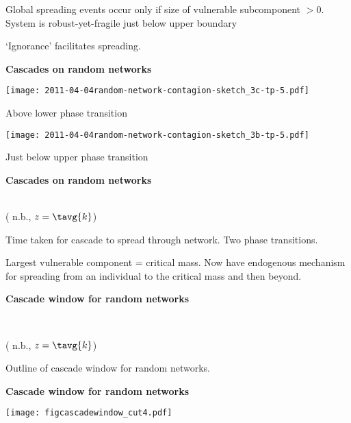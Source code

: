   
  
   
    Global spreading events occur only if size of vulnerable subcomponent $>0$.\\
   
    System is robust-yet-fragile just below upper boundary\cite{carlson1999a,carlson2000a,sornette2003a}
   
    `Ignorance' facilitates spreading.
  


  \textbf{Cascades on random networks}

      
    \texttt{[image: 2011-04-04random-network-contagion-sketch\_3c-tp-5.pdf]}
    
     
      Above lower phase transition
    
    
    \texttt{[image: 2011-04-04random-network-contagion-sketch\_3b-tp-5.pdf]}
    
     
      Just below upper phase transition
    
  


  \textbf{Cascades on random networks}

          
      \setlength\fboxsep{0pt}
      \setlength\fboxrule{0.5pt}
      \\
      \small{( n.b., $z = \tavg{k}$)}
      
      
       Time taken for cascade to spread through network.\cite{watts2002a}
       Two phase transitions.
      
    
    
     Largest vulnerable component = \alert{critical mass}.
     Now have endogenous mechanism for spreading from
      an individual to the critical mass and then beyond.
    


  \textbf{Cascade window for random networks}

  \begin{center}
    \setlength\fboxsep{0pt}
    \setlength\fboxrule{0.5pt}
    \\
  \end{center}
  \small{( n.b., $z = \tavg{k}$)}
  
   Outline of cascade window for random networks. 
  


  \textbf{Cascade window for random networks}

  \texttt{[image: figcascadewindow\_cut4.pdf]}




